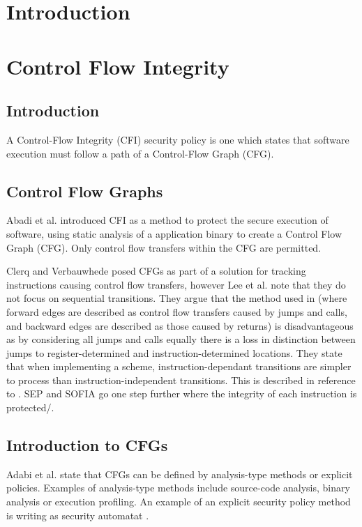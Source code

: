 \section{Introduction}
\section{Control Flow Integrity}
\subsection{Introduction}
A Control-Flow Integrity (CFI) security policy is one which states that software execution must follow a path of a Control-Flow Graph (CFG).
\subsection{Control Flow Graphs}
Abadi et al. \cite{Abadi2005} introduced CFI as a method to protect the secure execution of software, using static analysis of a application binary to create a Control Flow Graph (CFG). Only control flow transfers within the CFG are permitted.

Clerq and Verbauwhede \cite{DeClercq2017} posed CFGs as part of a solution for tracking instructions causing control flow transfers, however Lee et al. \cite{Lee2019} note that they do not focus on sequential transitions. They argue that the method used in \cite{DeClercq2017} (where forward edges are described as control flow transfers caused by jumps and calls, and backward edges are described as those caused by returns) is disadvantageous as by considering all jumps and calls equally there is a loss in distinction between jumps to register-determined and instruction-determined locations. They state that when implementing a scheme, instruction-dependant transitions are simpler to process than instruction-independent transitions. This is described in reference to \cite{Lee2016}. SEP \cite{Lee2019} and SOFIA \cite{DeClercq2017b} go one step further where the integrity of each instruction is protected/.
\ifnotesincluded
{}
\fi

\subsection{Introduction to CFGs}
Adabi et al. \cite{Abadi2005} state that CFGs can be defined by analysis-type methods or explicit policies. Examples of analysis-type methods include source-code analysis, binary analysis or execution profiling. An example of an explicit security policy method is writing as security automatat \cite{Erlingsson2004}. 


